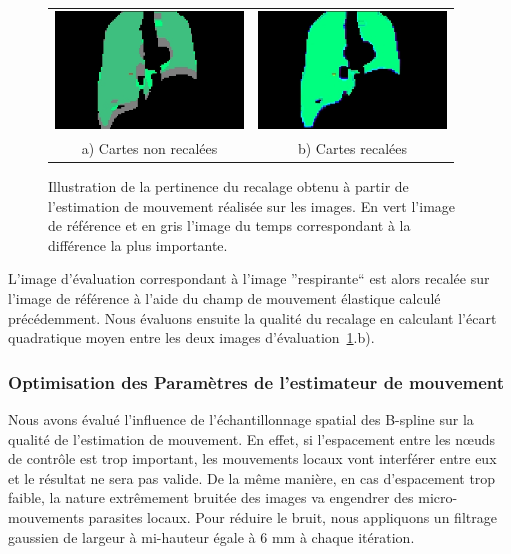\begin{figure}
\centering
\begin{tabular}{c c}
	\includegraphics[width=5cm]{images/sansCorrection} & \includegraphics[width=5cm]{images/avecCorrection} \\
	a) Cartes non recalées				& b) Cartes recalées
\end{tabular}
\caption[Illustration du recalage obtenu]{Illustration de la pertinence du recalage obtenu à partir de l'estimation de mouvement réalisée sur les images. En vert l'image de référence et en gris l'image du temps correspondant à la différence la plus importante. }
\label{lab:illustrationRecalage}
\end{figure}

L'image d'évaluation correspondant à l'image ''respirante`` est alors recalée sur l'image de référence à l'aide du champ de mouvement élastique calculé précédemment. Nous évaluons ensuite la qualité du recalage en calculant l'écart quadratique moyen entre les deux images d'évaluation~\ref{lab:illustrationRecalage}.b).

\subsubsection{Optimisation des Paramètres de l'estimateur de mouvement}

Nous avons évalué l'influence de l'échantillonnage spatial des B-spline sur la qualité de l'estimation de mouvement. En effet, si l'espacement entre les nœuds de contrôle est trop important, les mouvements locaux vont interférer entre eux et le résultat ne sera pas valide. De la même manière, en cas d'espacement trop faible, la nature extrêmement bruitée des images va engendrer des micro-mouvements parasites locaux. Pour réduire le bruit, nous appliquons un filtrage gaussien de largeur à mi-hauteur égale à 6 mm à chaque itération.


